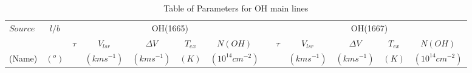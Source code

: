 \documentclass[preprint]{emulateapj}
\begin{document}
\begin{table}
\fontsize{7}{6}\selectfont
\centering
\caption{Table of Parameters for OH main lines}
\label{table:OH-parameters}
\renewcommand{\arraystretch}{1.5}
\begin{tabular}{ lllllllclllll  }
 \hline
 \hline
\multirow{2}{*}{$Source$} & \multicolumn{1}{c}{\multirow{2}{*}{$l/b$}} & \multicolumn{6}{c}{OH(1665)} & \multicolumn{5}{c}{OH(1667)}\\
\cline{3-7}
\cline{9-13}
 & & \multicolumn{1}{c}{$\tau$} & \multicolumn{1}{c}{$V_{lsr}$} & \multicolumn{1}{c}{$\Delta V$} & \multicolumn{1}{c}{$T_{ex}$} & \multicolumn{1}{c}{$N(OH)$} & & \multicolumn{1}{c}{$\tau$} & \multicolumn{1}{c}{$V_{lsr}$} & \multicolumn{1}{c}{$\Delta V$} & \multicolumn{1}{c}{$T_{ex}$} & \multicolumn{1}{c}{$N(OH)$} \\
 
(Name) & \multicolumn{1}{c}{$(^{o})$} & \multicolumn{1}{c}{$\ $} & \multicolumn{1}{c}{$(km s^{-1})$} & \multicolumn{1}{c}{$(km s^{-1})$} & \multicolumn{1}{c}{$(K)$} & \multicolumn{1}{c}{$(10^{14}cm^{-2})$} & & \multicolumn{1}{c}{$\ $} & \multicolumn{1}{c}{$(km s^{-1})$} & \multicolumn{1}{c}{$(km s^{-1})$} & \multicolumn{1}{c}{$(K)$} & \multicolumn{1}{c}{$(10^{14}cm^{-2})$} \\ 
\hline



\end{tabular}
\end{table}
\end{document}
